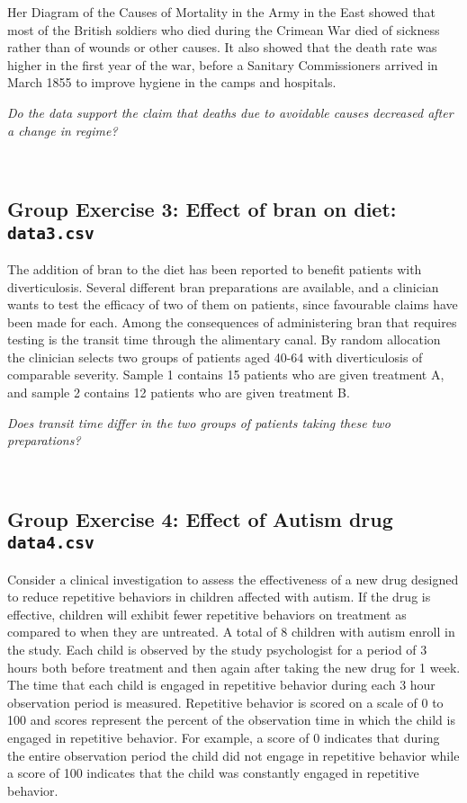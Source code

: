 \documentclass[]{article}
\begin{document}
Her Diagram of the Causes of Mortality in the Army in the East showed
that most of the British soldiers who died during the Crimean War died
of sickness rather than of wounds or other causes. It also showed that
the death rate was higher in the first year of the war, before a
Sanitary Commissioners arrived in March 1855 to improve hygiene in the
camps and hospitals.

{\emph{Do the data support the claim that deaths due to avoidable causes
decreased after a change in regime?}}

~

\hypertarget{group-exercise-3-effect-of-bran-on-diet-data3.csv}{%
\subsection{\texorpdfstring{Group Exercise 3: Effect of bran on diet:
\texttt{data3.csv}}{Group Exercise 3: Effect of bran on diet: data3.csv}}\label{group-exercise-3-effect-of-bran-on-diet-data3.csv}}

The addition of bran to the diet has been reported to benefit patients
with diverticulosis. Several different bran preparations are available,
and a clinician wants to test the efficacy of two of them on patients,
since favourable claims have been made for each. Among the consequences
of administering bran that requires testing is the transit time through
the alimentary canal. By random allocation the clinician selects two
groups of patients aged 40-64 with diverticulosis of comparable
severity. Sample 1 contains 15 patients who are given treatment A, and
sample 2 contains 12 patients who are given treatment B.

{\emph{Does transit time differ in the two groups of patients taking
these two preparations?}}

~

\hypertarget{group-exercise-4-effect-of-autism-drug-data4.csv}{%
\subsection{\texorpdfstring{Group Exercise 4: Effect of Autism drug
\texttt{data4.csv}}{Group Exercise 4: Effect of Autism drug data4.csv}}\label{group-exercise-4-effect-of-autism-drug-data4.csv}}

Consider a clinical investigation to assess the effectiveness of a new
drug designed to reduce repetitive behaviors in children affected with
autism. If the drug is effective, children will exhibit fewer repetitive
behaviors on treatment as compared to when they are untreated. A total
of 8 children with autism enroll in the study. Each child is observed by
the study psychologist for a period of 3 hours both before treatment and
then again after taking the new drug for 1 week. The time that each
child is engaged in repetitive behavior during each 3 hour observation
period is measured. Repetitive behavior is scored on a scale of 0 to 100
and scores represent the percent of the observation time in which the
child is engaged in repetitive behavior. For example, a score of 0
indicates that during the entire observation period the child did not
engage in repetitive behavior while a score of 100 indicates that the
child was constantly engaged in repetitive behavior.
\end{document}
